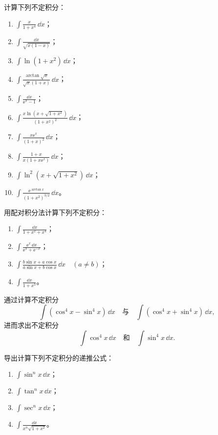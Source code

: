 \begin{xexercise}[1]
计算下列不定积分：
  \begin{enumerate}[label=(\arabic*)]
    \item $\displaystyle\int\frac{x}{1+x^4}\,\dd x$；
    \item $\displaystyle\int\frac{\dd x}{\sqrt{x(1-x)}}$；
    \item $\displaystyle\int\ln(1+x^2)\,\dd x$；
    \item $\displaystyle\int\frac{\arctan\sqrt{x}}{\sqrt{x}(1+x)}\,\dd x$；
    \item $\displaystyle\int\frac{\dd x}{\ee^x-1}$；
    \item $\displaystyle\int\frac{x\ln(x+\sqrt{1+x^2})}{(1+x^2)^2}\,\dd x$；
    \item $\displaystyle\int\frac{x\ee^x}{(1+x)^2}\,\dd x$；
    \item $\displaystyle\int\frac{1+x}{x(1+x\ee^x)}\,\dd x$；
    \item $\displaystyle\int\ln^2(x+\sqrt{1+x^2})\,\dd x$；
    \item $\displaystyle\int\frac{\ee^{\arctan x}}{(1+x^2)^{3/2}}\,\dd x$。
  \end{enumerate}
\end{xexercise}

\begin{xexercise}[2]
用配对积分法计算下列不定积分：
  \begin{enumerate}[label=(\arabic*)]
    \item $\displaystyle\int\frac{\dd x}{1+x^2+x^4}$；
    \item $\displaystyle\int\frac{\ee^x\,\dd x}{\ee^x+\ee^{-x}}$；
    \item $\displaystyle\int\frac{b\sin x+a\cos x}{a\sin x+b\cos x}\,\dd x\quad(a\ne b)$；
    \item $\displaystyle\int\frac{\dd x}{1+x^3}$。
  \end{enumerate}
\end{xexercise}

\begin{xexercise}[3]
通过计算不定积分
  \[
    \int(\cos^4x-\sin^4x)\,\dd x
    \quad\text{与}\quad
    \int(\cos^4x+\sin^4x)\,\dd x,
  \]
  进而求出不定积分
  \[
    \int\cos^4x\,\dd x
    \quad\text{和}\quad
    \int\sin^4x\,\dd x.
  \]
\end{xexercise}

\begin{xexercise}[4]
导出计算下列不定积分的递推公式：
  \begin{enumerate}[label=(\arabic*)]
    \item $\displaystyle\int\sin^nx\,\dd x$；
    \item $\displaystyle\int\tan^nx\,\dd x$；
    \item $\displaystyle\int\sec^nx\,\dd x$；
    \item $\displaystyle\int\frac{\dd x}{x^n\sqrt{1+x^2}}$。
  \end{enumerate}
\end{xexercise}

